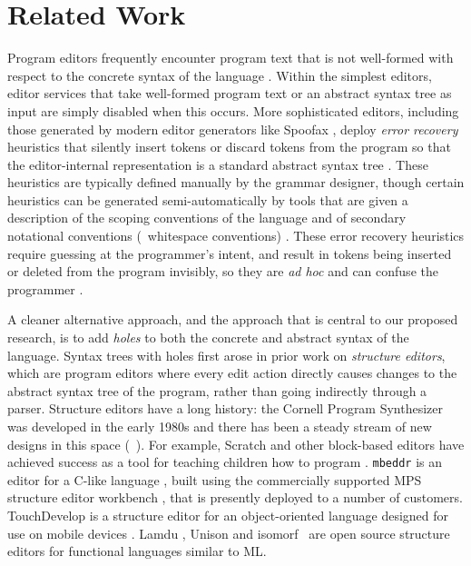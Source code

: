 \newcommand{\relatedWorkSection}{Related Work}
\section{\protect\relatedWorkSection} %
\label{sec:relatedWork}

Program editors frequently encounter program text that is not well-formed with
respect to the concrete syntax of the language \cite{popl-paper}.
%
Within the simplest editors, editor services that take well-formed program text
or an abstract syntax tree as input are simply disabled when this occurs.
%
More sophisticated editors, including those generated by modern editor
generators like Spoofax \cite{DBLP:conf/oopsla/KatsV10}, deploy \emph{error
recovery} heuristics that silently insert tokens or discard tokens from the
program so that the editor-internal representation is a standard abstract syntax
tree
\cite{DBLP:journals/siamcomp/AhoP72,charles1991practical,graham1979practical,DBLP:conf/oopsla/KatsJNV09}.
%
These heuristics are typically defined manually by the grammar designer, though
certain heuristics can be generated semi-automatically by tools that are given a
description of the scoping conventions of the language and of secondary
notational conventions (\eg{}~whitespace conventions)
\cite{DBLP:conf/oopsla/KatsJNV09,DBLP:conf/sle/JongeNKV09}.
%
These error recovery heuristics require guessing at the programmer's intent, and
result in tokens being inserted or deleted from the program invisibly, so they
are \emph{ad hoc} and can confuse the programmer
\cite{DBLP:conf/oopsla/KatsJNV09}.


A cleaner alternative approach, and the approach that is central to our proposed
research, is to add \emph{holes} to both the concrete and abstract syntax of the
language.
%
Syntax trees with holes first arose in prior work on \emph{structure editors},
which are program editors where every edit action directly causes changes to the
abstract syntax tree of the program, rather than going indirectly through a
parser.
%
Structure editors have a long history: the Cornell Program Synthesizer was
developed in the early 1980s \cite{teitelbaum_cornell_1981} and there has been a
steady stream of new designs in this space
(\eg{}~\cite{ko_barista:_2006,Resnick:2009:SP:1592761.1592779,voelter_mbeddr:_2012,tillmann_touchdevelop:_2011,lamdu,ActiveCodeCompletion,Greenfoot,Deuce}).
%
For example, Scratch and other block-based editors have achieved success as a
tool for teaching children how to program
\cite{Resnick:2009:SP:1592761.1592779}. \texttt{mbeddr} is an editor for a
C-like language \cite{voelter_mbeddr:_2012}, built using the commercially
supported MPS structure editor workbench \cite{voelter2011language}, that is
presently deployed to a number of customers.
%
TouchDevelop is a structure editor for an object-oriented language designed for
use on mobile devices \cite{tillmann_touchdevelop:_2011}. Lamdu \cite{lamdu},
Unison \cite{unison} and  isomorf~\cite{isomorf} are open source structure
editors for functional languages similar to ML.

